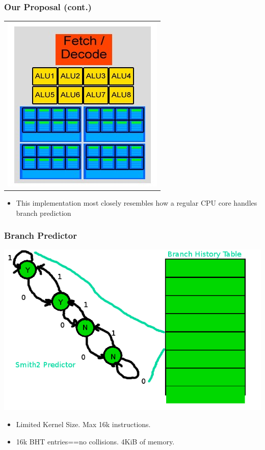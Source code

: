 \documentclass{beamer}
\begin{document}
\begin{frame}
	\frametitle{Our Proposal (cont.)}
	\begin{tabular}{c}
		\includegraphics[width=.5\textwidth]{Our-GPU---per-element-predictor.jpg}
	\end{tabular}
	\begin{itemize}
		\item This implementation most closely resembles how a regular CPU core handles branch prediction
	\end{itemize}
\end{frame}

\begin{frame}
    \frametitle{Branch Predictor}
    \includegraphics[height=.6\textheight]{bht.png}
    \begin{itemize}
     \item Limited Kernel Size.  Max 16k instructions.
     \item 16k BHT entries==no collisions.  4KiB of memory.
    \end{itemize}
\end{frame}
\end{document}
